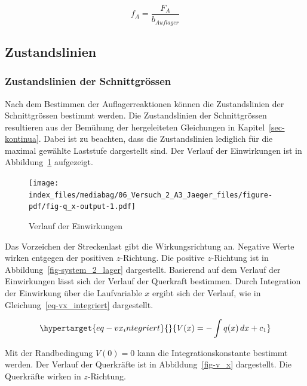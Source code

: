 \documentclass[
  12pt,
  letterpaper,
  egregdoesnotlikesansseriftitles]{scrreprt}
\begin{document}
\begin{equation}f_{A} = \frac{F_{A}}{b_{Auflager}}\end{equation}

\hypertarget{zustandslinien}{%
\subsection{Zustandslinien}\label{zustandslinien}}

\hypertarget{zustandslinien-der-schnittgruxf6ssen}{%
\subsubsection{Zustandslinien der
Schnittgrössen}\label{zustandslinien-der-schnittgruxf6ssen}}

Nach dem Bestimmen der Auflagerreaktionen können die Zustandslinien der
Schnittgrössen bestimmt werden. Die Zustandslinien der Schnittgrössen
resultieren aus der Bemühung der hergeleiteten Gleichungen in
Kapitel~\ref{sec-kontinua}. Dabei ist zu beachten, dass die
Zustandslinien lediglich für die maximal gewählte Laststufe dargestellt
sind. Der Verlauf der Einwirkungen ist in Abbildung~\ref{fig-q_x}
aufgezeigt.

\begin{figure}[H]

{\centering \texttt{[image: index\_files/mediabag/06\_Versuch\_2\_A3\_Jaeger\_files/figure-pdf/fig-q\_x-output-1.pdf]}

}

\caption{\label{fig-q_x}Verlauf der Einwirkungen}

\end{figure}

Das Vorzeichen der Streckenlast gibt die Wirkungsrichtung an. Negative
Werte wirken entgegen der positiven \(z\)-Richtung. Die positive
\(z\)-Richtung ist in Abbildung~\ref{fig-system_2_lager} dargestellt.
Basierend auf dem Verlauf der Einwirkungen lässt sich der Verlauf der
Querkraft bestimmen. Durch Integration der Einwirkung über die
Laufvariable \(x\) ergibt sich der Verlauf, wie in
Gleichung~\ref{eq-vx_integriert} dargestellt.

\begin{equation}\protect\hypertarget{eq-vx_integriert}{}{
V(x) = -\int q(x) \, dx + c_1
}\label{eq-vx_integriert}\end{equation}

Mit der Randbedingung \(V(0) = 0\) kann die Integrationskonstante
bestimmt werden. Der Verlauf der Querkräfte ist in
Abbildung~\ref{fig-v_x} dargestellt. Die Querkräfte wirken in
\(z\)-Richtung.
\end{document}
